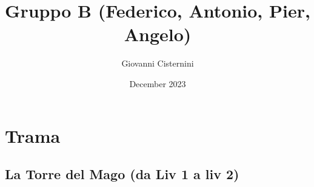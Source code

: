 \documentclass{article}
\title{Gruppo B (Federico, Antonio, Pier, Angelo)}
\author{Giovanni Cisternini}
\date{December 2023}
\begin{document}
\tableofcontents

\maketitle


\section{Trama}
  









\newpage
        \subsection{La Torre del Mago (da Liv 1 a liv 2)}
\end{document}
